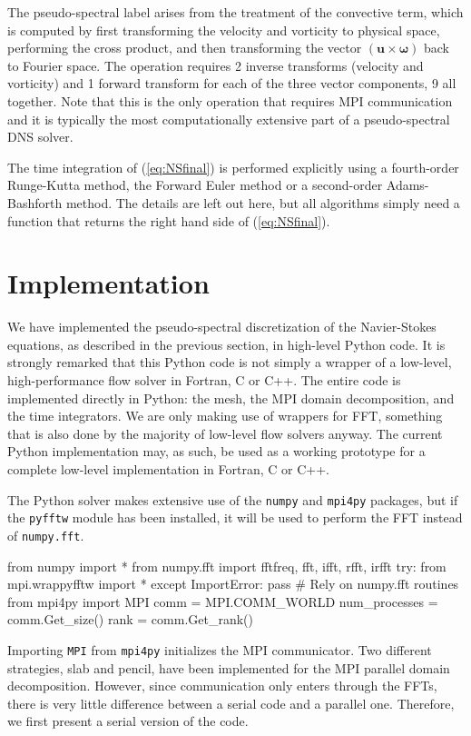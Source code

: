 \documentclass[11pt, oneside]{article}
\begin{document}
The pseudo-spectral label arises from the treatment of the convective term, which is computed by first transforming the velocity and vorticity to physical space, performing the cross product, and then transforming the vector ${(\bm{u}  \times  \bm{\omega})}$  back to Fourier space. The operation requires 2 inverse transforms (velocity and vorticity) and 1 forward transform for each of the three vector components, 9 all together. Note that this is the only operation that requires MPI communication and it is typically the most computationally extensive part of a pseudo-spectral DNS solver.

The time integration of (\ref{eq:NSfinal}) is performed explicitly using a fourth-order Runge-Kutta method, the Forward Euler method or a second-order Adams-Bashforth method. The details are left out here, but all algorithms simply need a function that returns the right hand side of (\ref{eq:NSfinal}).

\section{Implementation}

We have implemented the pseudo-spectral discretization of the Navier-Stokes equations, as described in the previous section, in high-level Python code. It is strongly remarked that this Python code is not simply a wrapper of a low-level, high-performance flow solver in Fortran, C or C++. The entire code is implemented directly in Python: the mesh, the MPI domain decomposition, and the time integrators. We are only making use of wrappers for FFT, something that is also done by the majority of low-level flow solvers anyway. The current Python implementation may, as such, be used as a working prototype for a complete low-level implementation in Fortran, C or C++.

The Python solver makes extensive use of the \texttt{numpy} and \texttt{mpi4py} packages, but if the \texttt{pyfftw} module has been installed, it will be used to perform the FFT instead of \texttt{numpy.fft}.

\begin{python}
from numpy import *
from numpy.fft import fftfreq, fft, ifft, rfft, irfft
try:
    from mpi.wrappyfftw import *
except ImportError:
    pass # Rely on numpy.fft routines
from mpi4py import MPI
comm = MPI.COMM_WORLD
num_processes = comm.Get_size()
rank = comm.Get_rank()
\end{python}
Importing \texttt{MPI} from \texttt{mpi4py} initializes the MPI communicator. Two different strategies, slab and pencil, have been implemented for the MPI parallel domain decomposition. However, since communication only enters through the FFTs, there is very little difference between a serial code and a parallel one. Therefore, we first present a serial version of the code.
\end{document}
